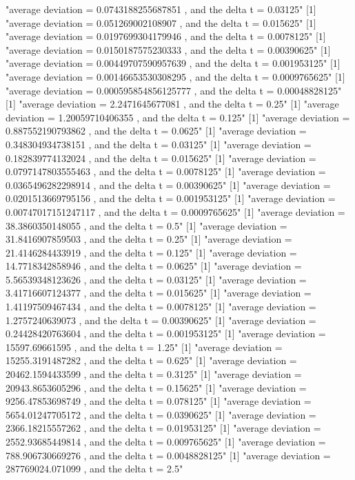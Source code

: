 \documentclass{article}
\begin{document}
{\begin{spverbatim}
[1] "average deviation =  0.0743188255687851 , and the delta t =  0.03125"
[1] "average deviation =  0.051269002108907 , and the delta t =  0.015625"
[1] "average deviation =  0.0197699304179946 , and the delta t =  0.0078125"
[1] "average deviation =  0.0150187575230333 , and the delta t =  0.00390625"
[1] "average deviation =  0.00449707590957639 , and the delta t =  0.001953125"
[1] "average deviation =  0.00146653530308295 , and the delta t =  0.0009765625"
[1] "average deviation =  0.000595854856125777 , and the delta t =  0.00048828125"
[1] "average deviation =  2.2471645677081 , and the delta t =  0.25"
[1] "average deviation =  1.20059710406355 , and the delta t =  0.125"
[1] "average deviation =  0.887552190793862 , and the delta t =  0.0625"
[1] "average deviation =  0.348304934738151 , and the delta t =  0.03125"
[1] "average deviation =  0.182839774132024 , and the delta t =  0.015625"
[1] "average deviation =  0.0797147803555463 , and the delta t =  0.0078125"
[1] "average deviation =  0.0365496282298914 , and the delta t =  0.00390625"
[1] "average deviation =  0.0201513669795156 , and the delta t =  0.001953125"
[1] "average deviation =  0.00747017151247117 , and the delta t =  0.0009765625"
[1] "average deviation =  38.3860350148055 , and the delta t =  0.5"
[1] "average deviation =  31.8416907859503 , and the delta t =  0.25"
[1] "average deviation =  21.4146284433919 , and the delta t =  0.125"
[1] "average deviation =  14.7718342858946 , and the delta t =  0.0625"
[1] "average deviation =  5.56539348123626 , and the delta t =  0.03125"
[1] "average deviation =  3.41716607124377 , and the delta t =  0.015625"
[1] "average deviation =  1.41197509467434 , and the delta t =  0.0078125"
[1] "average deviation =  1.2757240639073 , and the delta t =  0.00390625"
[1] "average deviation =  0.24428420763604 , and the delta t =  0.001953125"
[1] "average deviation =  15597.69661595 , and the delta t =  1.25"
[1] "average deviation =  15255.3191487282 , and the delta t =  0.625"
[1] "average deviation =  20462.1594433599 , and the delta t =  0.3125"
[1] "average deviation =  20943.8653605296 , and the delta t =  0.15625"
[1] "average deviation =  9256.47853698749 , and the delta t =  0.078125"
[1] "average deviation =  5654.01247705172 , and the delta t =  0.0390625"
[1] "average deviation =  2366.18215557262 , and the delta t =  0.01953125"
[1] "average deviation =  2552.93685449814 , and the delta t =  0.009765625"
[1] "average deviation =  788.906730669276 , and the delta t =  0.0048828125"
[1] "average deviation =  287769024.071099 , and the delta t =  2.5"

\end{spverbatim}}
\end{document}
